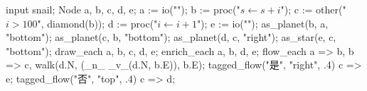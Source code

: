 \usemodule[zhfonts]

\startMPpage
input snail;
Node a, b, c, d, e;
a := io("");
b := proc("$s\leftarrow s + i$");
c := other("$i > 100$", diamond(b));
d := proc("$i\leftarrow i + 1$");
e := io("");
as_planet(b, a, "bottom"); as_planet(c, b, "bottom");
as_planet(d, c, "right"); as_star(e, c, "bottom");
draw_each a, b, c, d, e;
enrich_each a, b, d, e;
flow_each a => b, b => c, walk(d.N, (_n_ _v_(d.N, b.E)), b.E);
tagged_flow("是", "right", .4) c => e;
tagged_flow("否", "top", .4) c => d;
\stopMPpage